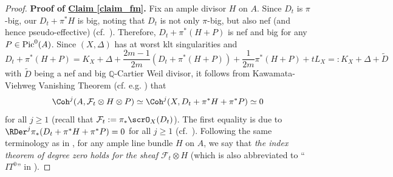 \begin{proof}
\par \vskip 1pc \noindent
\textbf{Proof of {\hyperref[claim_fm]{Claim \ref*{claim_fm}}}.}
Fix an ample divisor $H$ on $A$. 
Since $D_{t}$ is  $\pi$-big, our $D_t+\pi^*H$ is big, noting that $D_t$ is not only $\pi$-big, but also nef (and hence pseudo-effective) (cf.~\cite[Lemma 3.23]{KM98}).
Therefore, $D_t+\pi^*(H+P)$ is nef and big for any $P\in\textup{Pic}^0(A)$. 
Since $(X,\Delta)$ has at worst klt singularities and 
$$D_t+\pi^*(H+P)=K_X+\Delta+\frac{2m-1}{2m}(D_t+\pi^*(H+P))+\frac{1}{2m}\pi^*(H+P)+tL_X=:K_X+\Delta+\widetilde{D}$$
with $\widetilde{D}$ being a nef and big $\mathbb{Q}$-Cartier Weil divisor, it follows from  Kawamata-Viehweg Vanishing Theorem (cf. e.g. \cite[Theorem 2.70]{KM98}) that 
$$\Coh^j(A,\mathcal{F}_t\otimes H\otimes P)\simeq\Coh^j(X,D_t+\pi^*H+\pi^*P)\simeq0$$
for all $j\geqslant 1$ (recall that $\mathcal{F}_t:=\pi_*\scrO_X(D_t)$). 
The first equality is due to $\RDer^j\pi_*(D_t+\pi^*H+\pi^*P)=0$ for all $j\geqslant 1$ (cf.~\cite[Remark 1-2-6]{KMM87}).
Following the same terminology as in \cite[Definition 2.3]{Muk81}, for any ample line bundle $H$ on $A$, we say that \textit{the index theorem of degree zero holds for the sheaf $\mathcal{F}_t\otimes H$} (which is also abbreviated to ``$IT^0$'' in \cite[Proof of Theorem 3.1]{CCP08}). 



\end{proof}
